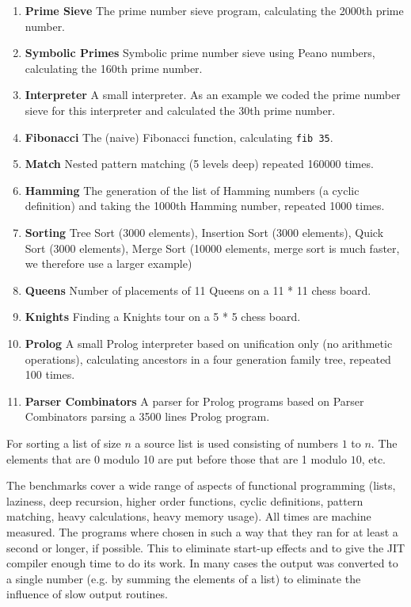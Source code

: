 \begin{enumerate}
\item {\bf \textsf{Prime Sieve}} The prime number sieve program, calculating the 2000th
prime number.
\item {\bf \textsf{Symbolic Primes}} Symbolic prime number sieve using Peano numbers,
calculating the 160th prime number.
\item {\bf \textsf{Interpreter}} A small \Sapl  interpreter. As an example we coded the prime
number sieve for this interpreter and calculated the 30th prime number.
\item {\bf  \textsf{Fibonacci}} The (naive) Fibonacci function, calculating \texttt{fib 35}.
\item {\bf \textsf{Match}} Nested pattern matching (5 levels deep) repeated 160000 times.
\item {\bf \textsf{Hamming}} The generation of the list of Hamming numbers (a cyclic
definition) and taking the 1000th Hamming number, repeated 1000 times.
\item {\bf \textsf{Sorting}} Tree Sort (3000 elements), Insertion Sort (3000 elements), Quick Sort (3000 elements), 
Merge Sort (10000 elements, merge sort is much faster, we therefore use a larger example)
\item {\bf \textsf{Queens}} Number of placements of 11 Queens on a 11 * 11 chess board.
\item {\bf \textsf{Knights}} Finding a Knights tour on a 5 * 5 chess board.
\item {\bf \textsf{Prolog}} A small Prolog interpreter based on unification only (no
arithmetic operations), calculating ancestors in a four generation family tree,
repeated 100 times.
\item {\bf \textsf{Parser Combinators}} A parser for Prolog programs based on Parser
Combinators parsing a 3500 lines Prolog program.
\end{enumerate}
%
For sorting a list of size $n$ a source list is  used consisting of numbers $1$
to $n$. The elements that are 0 modulo 10 are put before those that are 1 modulo
$10$, etc.

The benchmarks cover a wide range of aspects of functional programming (lists, laziness, 
deep recursion, higher order functions, cyclic definitions, pattern matching, 
heavy calculations, heavy memory usage).
All times are machine measured. The programs where chosen in such a way that
they ran for at least a second or longer, if possible. This to eliminate start-up 
effects and to give the \textsf{JIT} compiler enough time to do its work. 
In many cases the output was converted to a single number (e.g. 
by summing the elements of a list) to eliminate the influence of slow output 
routines.

